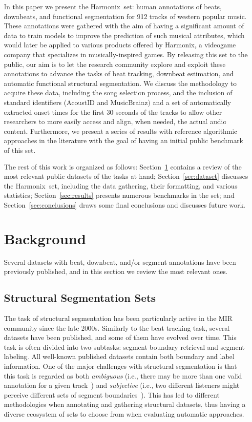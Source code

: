 \documentclass{article}
\newcommand{\setName}{Harmonix}
\begin{document}
In this paper we present the \setName~set: human annotations of beats, downbeats, and functional segmentation for 912 tracks of western popular music.
These annotations were gathered with the aim of having a significant amount of data to train models to improve the prediction of such musical attributes, which would later be applied to various products offered by Harmonix, a videogame company that specializes in musically-inspired games.
By releasing this set to the public, our aim is to let the research community explore and exploit these annotations to advance the tasks of beat tracking, downbeat estimation, and automatic functional structural segmentation.
We discuss the methodology to acquire these data, including the song selection process, and the inclusion of standard identifiers (AcoustID and MusicBrainz) and a set of automatically extracted onset times for the first 30 seconds of the tracks to allow other researchers to more easily access and align, when needed, the actual audio content.
Furthermore, we present a series of results with reference algorithmic approaches in the literature with the goal of having an initial public benchmark of this set.

The rest of this work is organized as follows: Section~\ref{sec:background} contains a review of the most relevant public datasets of the tasks at hand; Section~\ref{sec:dataset} discusses the \setName~set, including the data gathering, their formatting, and various statistics; Section~\ref{sec:results} presents numerous benchmarks in the set; and Section~\ref{sec:conclusions} draws some final conclusions and discusses future work.
%
\section{Background}\label{sec:background}

Several datasets with beat, downbeat, and/or segment annotations have been previously published, and in this section we review the most relevant ones.



\subsection{Structural Segmentation Sets}\label{sub:structsegm}

The task of structural segmentation has been particularly active in the MIR community since the late 2000s.
Similarly to the beat tracking task, several datasets have been published, and some of them have evolved over time.
This task is often divided into two subtasks: segment boundary retrieval and segment labeling.
All well-known published datasets contain both boundary and label information.
One of the major challenges with structural segmentation is that this task is regarded as both \textit{ambiguous} (i.e., there may be more than one valid annotation for a given track~\cite{McFee2017}) and \textit{subjective} (i.e., two different listeners might perceive different sets of segment boundaries~\cite{Bruderer2009}).
This has led to different methodologies when annotating and gathering structural datasets, thus having a diverse ecosystem of sets to choose from when evaluating automatic approaches.
\end{document}
